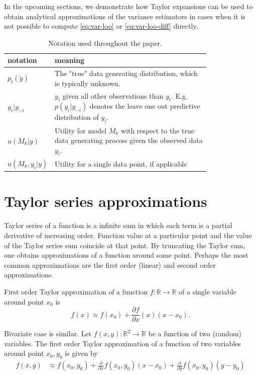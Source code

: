 \documentclass{article}
\begin{document}
In the upcoming sections, we demonstrate how Taylor expansions can be used to obtain analytical approximations of the variance estimators in cases when it is not possible to compute \eqref{eq:var-loo} or \eqref{eq:var-loo-diff} directly. 

\begin{table}[]
    \centering
    \begin{tabular}{l | p{0.8\linewidth}}
    \toprule
        notation & meaning \\ \midrule
        $p_t(\tilde{y})$ & The "true" data generating distribution, which is typically unknown. \\
        $y_i | y_{-i}$ & $y_i$ given all other observations than $y_i$. E.g. $p(y_i | y_{-i})$ denotes the leave one out predictive distribution of $y_i$. \\
        $ u(M_k | y) $ & Utility for model $M_k$ with respect to the true data generating process given the observed data $y_i$. \\
        $u(M_k, y_i | y)$ & Utility for a single data point, if applicable
        
    \end{tabular}
    \caption{Notation used throughout the paper.}
    \label{tab:notation}
\end{table}

\section{Taylor series approximations}
Taylor series of a function is a infinite sum in which each term is a partial derivative of increasing order. Function value at a particular point and the value of the Taylor series sum coincide at that point. By truncating the Taylor sum, one obtains approximations of a function around some point. Perhaps the most common approximations are the first order (linear) and second order approximations.

First order Taylor approximation of a function $f: \mathbb{R} \rightarrow \mathbb{R}$ of a single variable around point $x_0$ is
\begin{equation*}
    f(x) \approx f(x_0) + \frac{\partial f}{\partial x}(x)(x-x_0) \label{eq:tapprox1d}.
\end{equation*}

Bivariate case is similar. Let $f(x, y): \mathbb{R}^2 \rightarrow \mathbb{R}$ be a function of two (random) variables. The first order Taylor approximation of a function of two variables around point $x_0, y_0$ is given by
\begin{align*}
    f(x, y) &\approx f(x_0, y_0) + \frac{\partial }{\partial x} f(x_0, y_0) (x - x_0) + \frac{\partial }{\partial y} f(x_0, y_0) (y - y_0) \label{eq:tapprox2d}
\end{align*}
\end{document}
